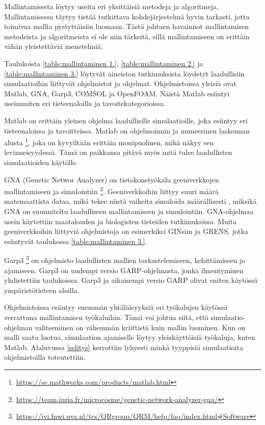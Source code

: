 \documentclass[utf8]{gradu3}
\begin{document}
Mallintamisesta löytyy useita eri yksittäisiä metodeja ja algoritmeja. 
Mallintamisessa täytyy tietää tutkittava kohdejärjestelmä hyvin tarkasti, 
jotta toimivaa mallia pystyttäisiin luomaan. Tästä johtuen havainnot 
mallintamisen metodeista ja algoritmeista ei ole niin tärkeitä, sillä
mallintamiseen on erittäin vähän yleistettäviä menetelmiä.

Taulukoista \ref{table:mallintaminen 1.}, \ref{table:mallintaminen 2.} ja 
\ref{table:mallintaminen 3.} löytyvät aineiston tutkimuksista löydetyt 
laadullisiin simulaatioihin liittyvät ohjelmistot ja ohjelmat.
Ohjelmistoissa yleisiä ovat Matlab, GNA, Garp3, COMSOL ja OpenFOAM. 
Näistä Matlab esiintyi useimmiten eri tieteenaloilla ja tavoitekategorioissa.

Matlab on erittäin yleinen ohjelma laadullisille simulaatioille, joka esiintyy eri 
tieteenaloissa ja tavoitteissa. Matlab on ohjelmoinnin ja numeerinen laskennan alusta
\footnote{\url{https://se.mathworks.com/products/matlab.html}},
joka on kyvyiltään erittäin monipuolinen, mikä näkyy sen levinneisyydessä. 
Tämä on paikkansa pitävä myös mitä tulee laadullisten simulaatioiden käytölle.

GNA (Genetic Networ Analyzer) on tietokonetyökalu geeniverkkojen mallintamiseen 
ja simulointiin 
\footnote{\url{https://team.inria.fr/microcosme/genetic-network-analyzer-gna/}}. 
Geeniverkkoihin liittyy suuri määrä matemaattista dataa, mikä tekee niistä vaikeita 
simuloida määrällisesti \parencite{gnaGeneticNetworkAnalyzer2003}, miksikä
GNA on suunniteltu laadulliseen mallintamiseen ja simulointiin. GNA-ohjelmaa 
usein käytettiin maatalouden ja biologisten tieteiden tutkimuksissa.
Muita geeniverkkoihin liittyviä ohjelmistoja on esimerkiksi GINsim ja GRENS,
jotka esiintyvät taulukossa \ref{table:mallintaminen 3.}.

Garp3 
\footnote{\url{https://ivi.fnwi.uva.nl/tcs/QRgroup/QRM/help/faq/index.html\#Software}} 
on ohjelmisto laadullisten mallien tarkastelemiseen, kehittämiseen ja 
ajamiseen. Garp3 on uudempi versio GARP-ohjelmasta, jonka ilmentyminen
yhdistettiin taulukoissa.
Garp3 ja aikaisempi versio GARP olivat eniten käytössä
ympäristötieteen aloilla.

Ohjelmistoissa esiintyy enemmän yhtäläisyyksiä eri työkalujen käytössä verrattuna
mallintamisen työkaluihin. Tämä voi johtua siitä, että simulaatio-ohjelman
valitseminen on vähemmän kriittistä kuin mallin luominen. 
Kun on malli saatu luotua, simulaation ajamiselle löytyy yleiskäyttöisiä 
työkaluja, kuten Matlab.
Alaluvussa \ref{selitys} kerrottiin lyhyesti minkä tyyppisiä 
simulaatioita ohjelmistoilla toteutettiin. 
\end{document}
